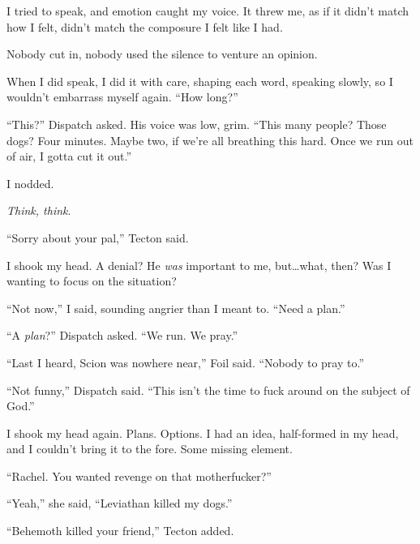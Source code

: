 I tried to speak, and emotion caught my voice.  It threw me, as if it didn't match how I felt, didn't match the composure I felt like I had.



Nobody cut in, nobody used the silence to venture an opinion.



When I did speak, I did it with care, shaping each word, speaking slowly, so I wouldn't embarrass myself again.  ``How long?''



``This?'' Dispatch asked.  His voice was low, grim.  ``This many people?  Those dogs?  Four minutes.  Maybe two, if we're all breathing this hard.  Once we run out of air, I gotta cut it out.''



I nodded.



\emph{Think, think}.



``Sorry about your pal,'' Tecton said.



I shook my head.  A denial?  He \emph{was} important to me, but\ldots what, then?  Was I wanting to focus on the situation?



``Not now,'' I said, sounding angrier than I meant to.  ``Need a plan.''



``A \emph{plan}?'' Dispatch asked.  ``We run.  We pray.''



``Last I heard, Scion was nowhere near,'' Foil said.  ``Nobody to pray to.''



``Not funny,'' Dispatch said.  ``This isn't the time to fuck around on the subject of God.''



I shook my head again.  Plans.  Options.  I had an idea, half-formed in my head, and I couldn't bring it to the fore.  Some missing element.



``Rachel.  You wanted revenge on that motherfucker?''



``Yeah,'' she said, ``Leviathan killed my dogs.''



``Behemoth killed your friend,'' Tecton added.




